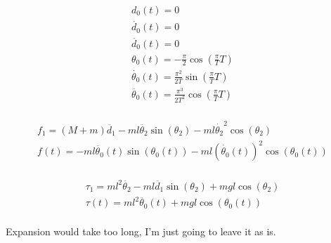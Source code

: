 \begin{solutionbox}[Q1-6]
    \begin{align*}
        d_0(t)=0                                                             \\
        \dot{d_0}(t)=0                                                       \\
        \ddot{d_0}(t)=0                                                      \\
        \theta_0(t)=-\frac{\pi}{2} \cos\left(\frac{\pi}{T}T\right)           \\
        \dot{\theta_0}(t)= \frac{\pi^2}{2T} \sin\left(\frac{\pi}{T}T\right)  \\
        \ddot{\theta_0}(t)=\frac{\pi^3}{2T^2}\cos\left(\frac{\pi}{T}T\right) \\
    \end{align*}

    \begin{align*}
        f_1 = (M+m)\ddot{d_1}-ml\ddot{\theta_2}\sin(\theta_2)-ml\dot{\theta_2}^2\cos(\theta_2)           \\
        f(t) =-ml\ddot{\theta_0}(t)\sin(\theta_0(t))-ml\left(\dot{\theta_0}(t)\right)^2\cos(\theta_0(t)) \\
    \end{align*}

    \begin{align*}
        \tau_1 = ml^2\ddot{\theta_2}-ml\ddot{d_1}\sin(\theta_2) + mgl\cos(\theta_2) \\
        \tau(t) = ml^2 \ddot{\theta_0}(t) + mgl\cos(\theta_0(t))                    \\
    \end{align*}

    Expansion would take too long, I'm just going to leave it as is.
\end{solutionbox}

